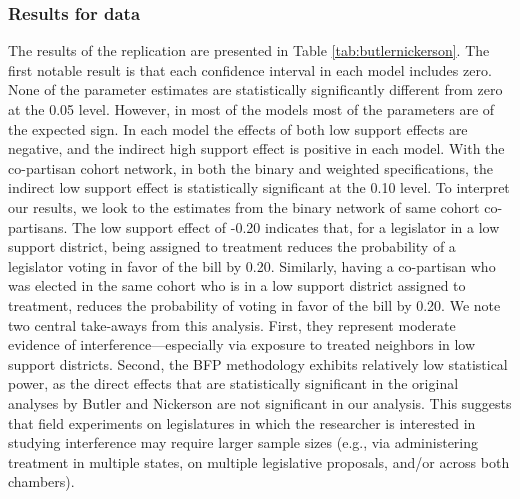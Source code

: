 \documentclass[12pt]{article}
\begin{document}
\subsubsection{Results for \citet{butler2011can} data}

The results of the \citet{butler2011can} replication are presented in Table \ref{tab:butlernickerson}.  The first notable result is that each confidence interval in each model includes zero. None of the parameter estimates are statistically significantly different from zero at the 0.05 level. However, in most of the models most of the parameters are of the expected sign. In each model the effects of both low support effects are negative, and the indirect high support effect is positive in each model. With the co-partisan cohort network, in both the binary and weighted specifications, the indirect low support effect is statistically significant at the 0.10 level.  To interpret our results, we look to the estimates from the binary network of same cohort co-partisans. The low support effect of -0.20 indicates that, for a legislator in a low support district, being assigned to treatment reduces the probability of a legislator voting in favor of the bill by 0.20. Similarly, having a co-partisan who was elected in the same cohort who is in a low support district assigned to treatment, reduces the probability of voting in favor of the bill by 0.20. We note two central take-aways from this analysis. First, they represent moderate evidence of interference---especially via exposure to treated neighbors in low support districts. Second, the BFP methodology exhibits relatively low statistical power, as the direct effects that are statistically significant in the original analyses by Butler and Nickerson are not significant in our analysis. This suggests that field experiments on legislatures in which the researcher is interested in studying interference may require larger sample sizes (e.g., via administering treatment in multiple states, on multiple legislative proposals, and/or across both chambers).
\end{document}
